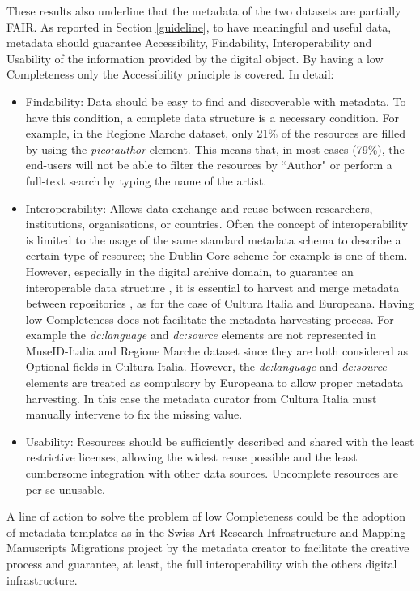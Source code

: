 \documentclass[epsfig,a4paper,12pt,titlepage]{book}
\begin{document}
These results also underline that the metadata of the two datasets are partially FAIR. As reported in Section \ref{guideline}, to have meaningful and useful data, metadata should guarantee Accessibility, Findability, Interoperability and Usability of the information provided by the digital object. By having a low Completeness only the Accessibility principle is covered.
In detail:
\begin{itemize}
    \item Findability: Data should be easy to find and discoverable with metadata. To have this condition, a complete data structure is a necessary condition. For example, in the Regione Marche dataset, only 21\% of the resources are filled by using the \textit{pico:author} element. This means that, in most cases (79\%), the end-users will not be able to filter the resources by ``Author" or perform a full-text search by typing the name of the artist.    
  
    \item Interoperability: Allows data exchange and reuse between researchers, institutions, organisations, or countries. Often the concept of interoperability is limited to the usage of the same standard metadata schema to describe a certain type of resource; the Dublin Core scheme for example is one of them. However, especially in the digital archive domain, to guarantee an interoperable data structure \cite{chiarcos2012interoperability}, it is essential  to harvest and merge metadata between repositories \cite{koulouris2015aggregating}, as for the case of  Cultura Italia and Europeana. Having low Completeness does not facilitate the metadata harvesting process. For example the \textit{dc:language} and \textit{dc:source} elements are not represented in MuseID-Italia and Regione Marche dataset since they are both considered as Optional fields in Cultura Italia. However, the \textit{dc:language} and \textit{dc:source} elements are treated as compulsory by Europeana to allow proper metadata harvesting. In this case the metadata curator from Cultura Italia must manually intervene to fix the missing value.
  
    \item Usability: Resources should be sufficiently described and shared with the least restrictive licenses, allowing the widest reuse possible and the least cumbersome integration with other data sources. Uncomplete resources are per se unusable.
\end{itemize}

A line of action to solve the problem of low Completeness could be the adoption of metadata templates as in the Swiss Art Research Infrastructure and Mapping Manuscripts Migrations project by the metadata creator to facilitate the creative process and guarantee, at least, the full interoperability with the others digital infrastructure.
\color{black}
\end{document}
